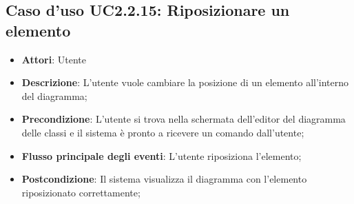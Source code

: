 \documentclass[../AnalisiDeiRequisiti.tex]{subfiles}
\begin{document}
			\subsection{Caso d'uso UC2.2.15: Riposizionare un elemento}
			\begin{itemize}
				\item \textbf{Attori}: Utente
				\item \textbf{Descrizione}: L'utente vuole cambiare la posizione di un elemento all'interno del diagramma;
				\item \textbf{Precondizione}: L'utente si trova nella schermata dell'editor del diagramma delle classi e il sistema è pronto a ricevere un comando dall'utente;
				\item \textbf{Flusso principale degli eventi}: L'utente riposiziona l'elemento;
				\item \textbf{Postcondizione}: Il sistema visualizza il diagramma con l'elemento riposizionato correttamente;
			\end{itemize}
\end{document}
